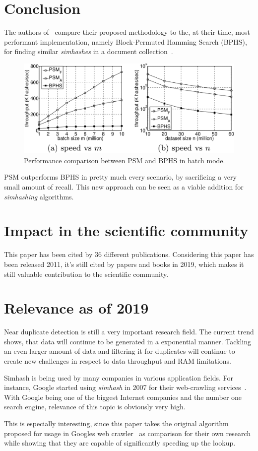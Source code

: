 \documentclass[12pt,a4paper,DIV=calc]{scrartcl}
\begin{document}
\section{Conclusion}
The authors of~\cite{inproc:main} compare their proposed methodology to the, at their time, most performant implementation, namely Block-Permuted Hamming Search (BPHS), for finding similar \emph{simhashes} in a document collection~\cite{Manku:2007:DNW:1242572.1242592}.

\begin{figure}[H]
    \includegraphics[scale=0.4]{./gfx/performance_comparison.png}
    \centering
    \caption{Performance comparison between PSM and BPHS in batch mode.}\label{fig:performance-comparison}
\end{figure}

PSM outperforms BPHS in pretty much every scenario, by sacrificing a very small amount of recall.
This new approach can be seen as a viable addition for \emph{simhashing} algorithms.


\section{Impact in the scientific community}
This paper has been cited by 36 different publications.
Considering this paper has been released 2011, it's still cited by papers and books in 2019, which makes it still valuable contribution to the scientific community.

\section{Relevance as of 2019}
Near duplicate detection is still a very important research field.
The current trend shows, that data will continue to be generated in a exponential manner.
Tackling an even larger amount of data and filtering it for duplicates will continue to create new challenges in respect to data throughput and RAM limitations.

Simhash is being used by many companies in various application fields.
For instance, Google started using \emph{simhash} in 2007 for their web-crawling services~\cite{Manku:2007:DNW:1242572.1242592}.
With Google being one of the biggest Internet companies and the number one search engine, relevance of this topic is obviously very high.

This is especially interesting, since this paper takes the original algorithm proposed for usage in Googles web crawler~\cite{Manku:2007:DNW:1242572.1242592} as comparison for their own research while showing that they are capable of significantly speeding up the lookup.

\printbibliography
\end{document}
